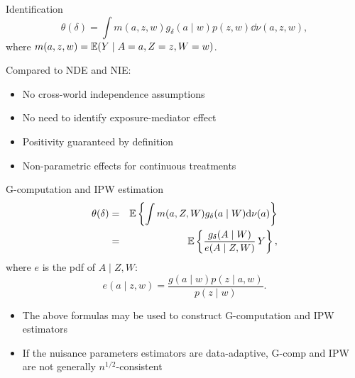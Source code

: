 \documentclass{beamer}
\begin{document}

\begin{frame}{Identification}
  \begin{equation*}
    \theta(\delta) = \int m(a, z,
    w)g_\delta(a\mid w)p(z,w)\dd\nu(a,z,w),
  \end{equation*}
where $m(a, z, w) = \mathbb{E}(Y\mid A=a, Z=z, W=w)$.
  \begin{block}{Compared to NDE and NIE:}
    \begin{itemize}
    \item No cross-world independence assumptions
    \item No need to identify exposure-mediator effect
    \item Positivity guaranteed by definition
    \item Non-parametric effects for continuous treatments
    \end{itemize}
  \end{block}

\note{
}

\end{frame}


\begin{frame}{G-computation and IPW estimation}
  \begin{eqnarray*}
    \theta(\delta) &=& \mathbb{E}\left\{\int m(a, Z, W)
                       g_\delta(a \mid W)\mathrm{d}\nu(a) \right\}\label{eq:gcomp}\\
                   &=& \mathbb{E} \left\{\frac{g_\delta(A \mid W)}
                       {e(A \mid Z, W)}\, Y \right\},
  \end{eqnarray*}
  where $e$ is the pdf of $A\mid Z,W$:
  \[e(a \mid z, w) = \frac{g(a\mid w) p(z\mid a, w)}{p(z\mid w)}.\]
  \begin{itemize}
  \item The above formulas may be used to construct G-computation and
    IPW estimators
  \item If the nuisance parameters estimators are data-adaptive,
    G-comp and IPW are not generally $n^{1/2}$-consistent
  \end{itemize}

\note{
}

\end{frame}
\end{document}
